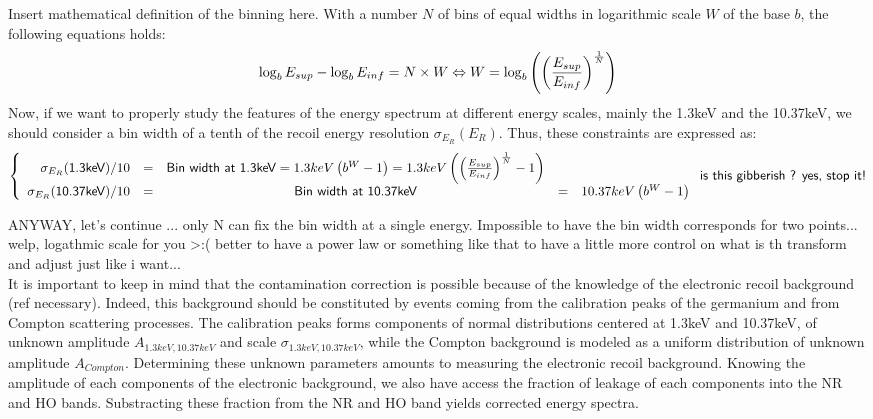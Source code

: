 {\color{red} Insert mathematical definition of the binning here.}
\label{par:bin-width}
With a number $N$ of bins of equal widths in logarithmic scale $W$ of the base $b$, the following equations holds:
\begin{equation}
\log_b E_{sup} - \log_b E_{inf} = N \times W \\
\Leftrightarrow W = \log_b \left( \left( \frac{E_{sup}}{E_{inf}} \right)^\frac{1}{N} \right)
\end{equation}
Now, if we want to properly study the features of the energy spectrum at different energy scales, mainly the 1.3keV and the 10.37keV, we should consider a bin width of a tenth of the recoil energy resolution $\sigma_{E_R}\left(E_R\right)$. Thus, these constraints are expressed as:
\begin{equation}
\left\{
\begin{array}{r c c c l}

\sigma_{E_R}(\textsf{1.3keV}) / 10 
&=& \textsf{Bin width at 1.3keV}
= 1.3keV \left(b^W -1 \right)
= 1.3keV \left( \left( \frac{E_{sup}}{E_{inf}} \right)^\frac{1}{N} -1 \right)

\\

\sigma_{E_R}(\textsf{10.37keV}) / 10 &=& \textsf{Bin width at 10.37keV} &=& 10.37keV \left(b^W -1\right) \\
\end{array}
\right.
\\
\textsf{is this gibberish ? yes, stop it!}
\end{equation}

ANYWAY, let's continue ... only N can fix the bin width at a single energy. Impossible to have the bin width corresponds for two points... welp, logathmic scale for you >:( better to have a power law or something like that to have a little more control on what is th transform and adjust just like i want...\\

It is important to keep in mind that the contamination correction is possible because of the knowledge of the electronic recoil background (ref necessary). Indeed, this background should be constituted by events coming from the calibration peaks of the germanium and from Compton scattering processes. The calibration peaks forms components of normal distributions centered at 1.3keV and 10.37keV, of unknown amplitude $A_{1.3keV, 10.37keV}$ and scale $\sigma_{1.3keV, 10.37keV}$, while the Compton background is modeled as a uniform distribution of unknown amplitude $A_{Compton}$.
Determining these unknown parameters amounts to measuring the electronic recoil background. Knowing the amplitude of each components of the electronic background, we also have access the fraction of leakage of each components into the NR and HO bands. Substracting these fraction from the NR and HO band yields corrected energy spectra.

